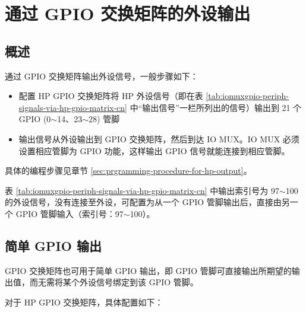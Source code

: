 \documentclass[main\_\_CN.tex]{subfiles}
\begin{document}
\section{通过 GPIO 交换矩阵的外设输出}
\label{sec:peripheral-output-via-gpio-matrix}

\subsection{概述}

通过 GPIO 交换矩阵输出外设信号，一般步骤如下：
\begin{itemize}
    \item 配置 HP GPIO 交换矩阵将 HP 外设信号（即在表 \ref{tab:iomuxgpio-periph-signals-via-hp-gpio-matrix-cn} 中``输出信号”一栏所列出的信号）输出到 21 个 GPIO (0$\sim$14、23$\sim$28) 管脚
    \item 输出信号从外设输出到 GPIO 交换矩阵，然后到达 IO MUX。IO MUX 必须设置相应管脚为 GPIO 功能，这样输出 GPIO 信号就能连接到相应管脚。
\end{itemize}

具体的编程步骤见章节 \ref{sec:prgramming-procedure-for-hp-output}。

\begin{tiplisting}
表 \ref{tab:iomuxgpio-periph-signals-via-hp-gpio-matrix-cn} 中输出索引号为 97$\sim$100 的外设信号，没有连接至外设，可配置为从一个 GPIO 管脚输出后，直接由另一个 GPIO 管脚输入（索引号：97$\sim$100）。
\end{tiplisting}
\vspace{-2em}

\subsection{简单 GPIO 输出}
\label{sec:simple_gpio_out}

GPIO 交换矩阵也可用于简单 GPIO 输出，即 GPIO 管脚可直接输出所期望的输出值，而无需将某个外设信号绑定到该 GPIO 管脚。

对于 HP GPIO 交换矩阵，具体配置如下：
\end{document}
